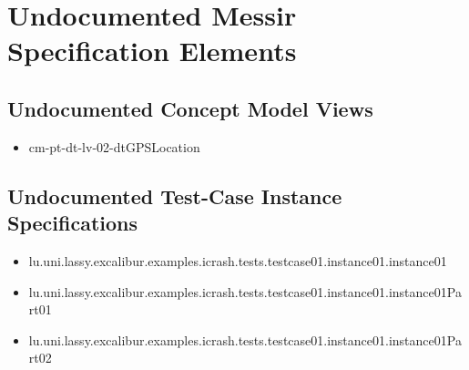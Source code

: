 	
\chapter{Undocumented Messir Specification Elements}





















\section[Undocumented Concept Model Views]{Undocumented Concept Model Views}
\begin{itemize}
\item cm-pt-dt-lv-02-dtGPSLocation 
\end{itemize}







\section[Undocumented Test-Case Instance Specifications]{Undocumented Test-Case Instance Specifications}
\begin{itemize}
\item lu.uni.lassy.excalibur.examples.icrash.tests.testcase01.instance01.instance01 
\item lu.uni.lassy.excalibur.examples.icrash.tests.testcase01.instance01.instance01Part01 
\item lu.uni.lassy.excalibur.examples.icrash.tests.testcase01.instance01.instance01Part02 
\end{itemize}



